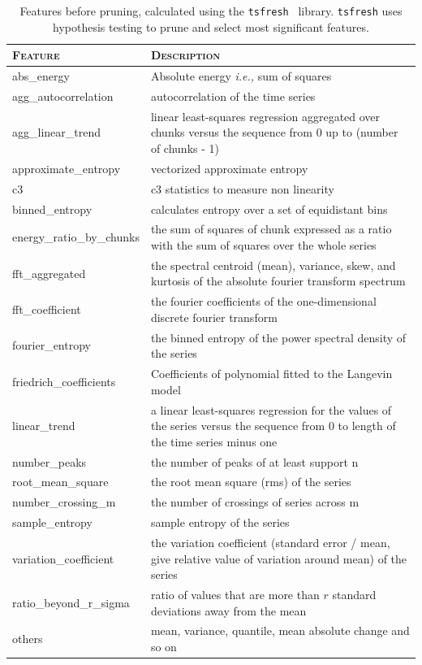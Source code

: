 \documentclass[manuscript]{acmart}
\newcommand{\ie}{{\it i.e.,}\xspace}
\begin{document}
\begin{table}
	\centering
	\footnotesize
    \caption{Features before pruning, calculated using the \texttt{tsfresh}~\cite{tsfresh2018code} library. \texttt{tsfresh} uses hypothesis testing to prune and select most significant features.}
    \begin{tabular}{p{2.25cm} p{12 cm}}
    \hline \textsc{\bfseries Feature} & \textsc{\bfseries Description}\\
    \hline\hline
    \rowcolor{gray!20} abs\_energy & Absolute energy \ie sum of squares   \\
    agg\_autocorrelation & autocorrelation of the time series \\
    \rowcolor{gray!20} agg\_linear\_trend & linear least-squares regression aggregated over chunks versus the sequence from 0 up to (number of chunks - 1) \\
    approximate\_entropy & vectorized approximate entropy \\
    \rowcolor{gray!20} c3 & c3 statistics to measure non linearity \\
    binned\_entropy & calculates entropy over a set of equidistant bins \\
    \rowcolor{gray!20} energy\_ratio\_by\_chunks & the sum of squares of chunk expressed as a ratio with the sum of squares over the whole series \\
    fft\_aggregated & the spectral centroid (mean), variance, skew, and kurtosis of the absolute fourier transform spectrum \\
    \rowcolor{gray!20} fft\_coefficient & the fourier coefficients of the one-dimensional discrete fourier transform \\
    fourier\_entropy & the binned entropy of the power spectral density of the series \\
    \rowcolor{gray!20} friedrich\_coefficients & Coefficients of polynomial fitted to the Langevin model \\
    linear\_trend & a linear least-squares regression for the values of the series versus the sequence from 0 to length of the time series minus one \\
     \rowcolor{gray!20} number\_peaks & the number of peaks of at least support n \\
    root\_mean\_square & the root mean square (rms) of the series \\
     \rowcolor{gray!20} number\_crossing\_m & the number of crossings of series across m \\
    sample\_entropy & sample entropy of the series \\
     \rowcolor{gray!20} variation\_coefficient & the variation coefficient (standard error / mean, give relative value of variation around mean) of the series \\
    ratio\_beyond\_r\_sigma & ratio of values that are more than $r$ standard deviations away from the mean \\
     \rowcolor{gray!20} others & mean, variance, quantile, mean absolute change and so on \\
    \hline
    \hline
    \end{tabular}
    \label{tbl:feat_list}
\end{table}
\end{document}
